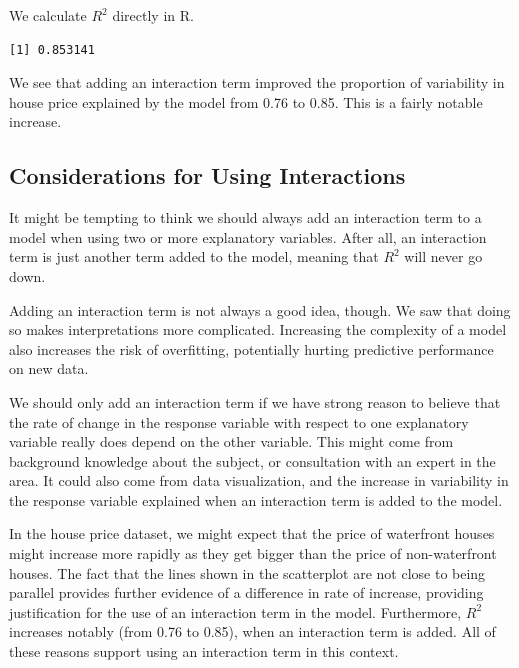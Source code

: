 \documentclass[
  letterpaper,
  DIV=11,
  numbers=noendperiod]{scrreprt}
\newenvironment{Shaded}{\begin{snugshade}}{\end{snugshade}}
\newcommand{\FunctionTok}[1]{\textcolor[rgb]{0.28,0.35,0.67}{#1}}
\newcommand{\NormalTok}[1]{\textcolor[rgb]{0.00,0.23,0.31}{#1}}
\newcommand{\SpecialCharTok}[1]{\textcolor[rgb]{0.37,0.37,0.37}{#1}}
\begin{document}
We calculate \(R^2\) directly in R.

\begin{Shaded}
\end{Shaded}

\begin{verbatim}
[1] 0.853141
\end{verbatim}

We see that adding an interaction term improved the proportion of
variability in house price explained by the model from 0.76 to 0.85.
This is a fairly notable increase.

\subsection{Considerations for Using
Interactions}\label{considerations-for-using-interactions}

It might be tempting to think we should always add an interaction term
to a model when using two or more explanatory variables. After all, an
interaction term is just another term added to the model, meaning that
\(R^2\) will never go down.

Adding an interaction term is not always a good idea, though. We saw
that doing so makes interpretations more complicated. Increasing the
complexity of a model also increases the risk of overfitting,
potentially hurting predictive performance on new data.

We should only add an interaction term if we have strong reason to
believe that the rate of change in the response variable with respect to
one explanatory variable really does depend on the other variable. This
might come from background knowledge about the subject, or consultation
with an expert in the area. It could also come from data visualization,
and the increase in variability in the response variable explained when
an interaction term is added to the model.

In the house price dataset, we might expect that the price of waterfront
houses might increase more rapidly as they get bigger than the price of
non-waterfront houses. The fact that the lines shown in the scatterplot
are not close to being parallel provides further evidence of a
difference in rate of increase, providing justification for the use of
an interaction term in the model. Furthermore, \(R^2\) increases notably
(from 0.76 to 0.85), when an interaction term is added. All of these
reasons support using an interaction term in this context.
\end{document}

